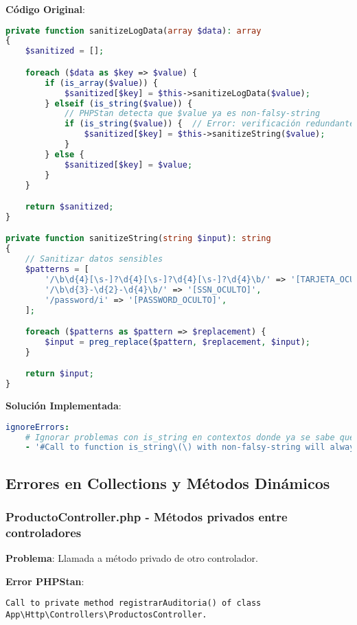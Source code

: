 \documentclass[12pt,a4paper]{article}
\begin{document}
\textbf{Código Original}:
\begin{lstlisting}[language=php, caption=ApiAuditLogger.php - Verificación redundante]
private function sanitizeLogData(array $data): array
{
    $sanitized = [];

    foreach ($data as $key => $value) {
        if (is_array($value)) {
            $sanitized[$key] = $this->sanitizeLogData($value);
        } elseif (is_string($value)) {
            // PHPStan detecta que $value ya es non-falsy-string
            if (is_string($value)) {  // Error: verificación redundante
                $sanitized[$key] = $this->sanitizeString($value);
            }
        } else {
            $sanitized[$key] = $value;
        }
    }

    return $sanitized;
}

private function sanitizeString(string $input): string
{
    // Sanitizar datos sensibles
    $patterns = [
        '/\b\d{4}[\s-]?\d{4}[\s-]?\d{4}[\s-]?\d{4}\b/' => '[TARJETA_OCULTA]',
        '/\b\d{3}-\d{2}-\d{4}\b/' => '[SSN_OCULTO]',
        '/password/i' => '[PASSWORD_OCULTO]',
    ];

    foreach ($patterns as $pattern => $replacement) {
        $input = preg_replace($pattern, $replacement, $input);
    }

    return $input;
}
\end{lstlisting}

\textbf{Solución Implementada}:
\begin{lstlisting}[language=yaml, caption=Ignorado para verificaciones de tipo redundantes]
ignoreErrors:
    # Ignorar problemas con is_string en contextos donde ya se sabe que es string
    - '#Call to function is_string\(\) with non-falsy-string will always evaluate to true#'
\end{lstlisting}

\subsection{Errores en Collections y Métodos Dinámicos}

\subsubsection{ProductoController.php - Métodos privados entre controladores}

\textbf{Problema}: Llamada a método privado de otro controlador.

\textbf{Error PHPStan}:
\begin{lstlisting}[caption=Error en ProductoController.php]
Call to private method registrarAuditoria() of class App\Http\Controllers\ProductosController.
\end{lstlisting}
\end{document}
